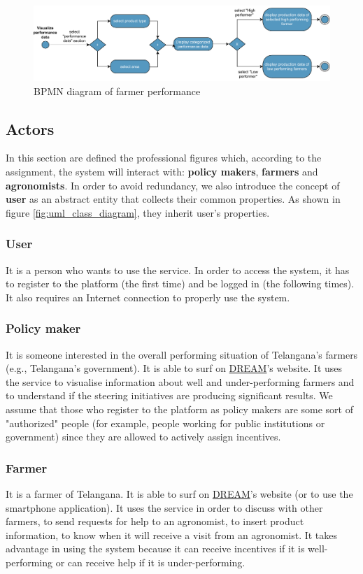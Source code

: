 \begin{figure}[H]
	\centering
    \includegraphics[width=\textwidth]{Images/BPMN/Performance.pdf}
	\caption{\label{fig:bpmn_performance}BPMN diagram of farmer performance}
\end{figure}

\subsection{Actors}
\label{sec:actors}
In this section are defined the professional figures which, according to the assignment, the system will interact with: \textbf{policy makers}, \textbf{farmers} and \textbf{agronomists}. In order to avoid redundancy, we also introduce the concept of \textbf{user} as an abstract entity that collects their common properties. As shown in figure \ref{fig:uml_class_diagram}, they inherit user's properties.
\subsubsection*{User}
It is a person who wants to use the service. In order to access the system, it has to register to the platform (the first time) and be logged in (the following times). It also requires an Internet connection to properly use the system.
\subsubsection*{Policy maker}
It is someone interested in the overall performing situation of Telangana’s farmers (e.g., Telangana’s government). It is able to surf on \hyperref[tab:acronymsTable]{DREAM}’s website. It uses the service to visualise information about well and under-performing farmers and to understand if the steering initiatives are producing significant results. We assume that those who register to the platform as policy makers are some sort of "authorized" people (for example, people working for public institutions or government) since they are allowed to actively assign incentives.
\subsubsection*{Farmer}
It is a farmer of Telangana. It is able to surf on \hyperref[tab:acronymsTable]{DREAM}’s website (or to use the smartphone application). It uses the service in order to discuss with other farmers, to send requests for help to an agronomist, to insert product information, to know when it will receive a visit from an agronomist. It takes advantage in using the system because it can receive incentives if it is well-performing or can receive help if it is under-performing.
